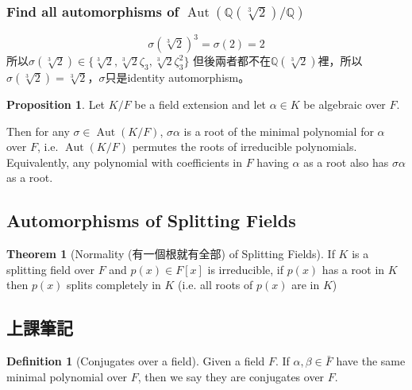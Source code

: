 \documentclass[12pt]{article}
\theoremstyle{definition}
\newtheorem{thm}{Theorem}
\newtheorem{dfn}{Definition}
\newtheorem{prop}{Proposition}
\newcommand{\QQ}{\mathbb Q}
\DeclareMathOperator{\Aut}{Aut}
\begin{document}
\subsubsection*{Find all automorphisms of $\Aut(\QQ(\sqrt[3]{2})/\QQ)$}
\[\sigma(\sqrt[3]{2})^3=\sigma(2)=2\]
所以$\sigma(\sqrt[3]{2})\in \{\sqrt[3]{2},\sqrt[3]{2}\zeta_3, \sqrt[3]{2}\zeta_3^2\}$
但後兩者都不在$\QQ(\sqrt[3]{2})$裡，所以$\sigma(\sqrt[3]{2})=\sqrt[3]{2}$，$\sigma$只是identity automorphism。

\begin{prop}
	Let $K/F$ be a field extension and let $\alpha\in K$ be algebraic over $F$.

	Then for any $\sigma\in\Aut(K/F)$, $\sigma\alpha$ is a root of the minimal polynomial for $\alpha$ over $F$,
	i.e. $\Aut(K/F)$ permutes the roots of irreducible polynomials. Equivalently, any polynomial with coefficients in $F$ having $\alpha$ as a root also has $\sigma\alpha$ as a root.
\end{prop}

\subsection{Automorphisms of Splitting Fields}

\begin{thm}[Normality (有一個根就有全部) of Splitting Fields]
	If $K$ is a splitting field over $F$ and $p(x)\in F[x]$ is irreducible,
	if $p(x)$ has a root in $K$ then $p(x)$ splits completely in $K$ (i.e. all roots of $p(x)$ are in $K$)
\end{thm}


























\subsection{上課筆記}

\begin{dfn}[Conjugates over a field]
	Given a field $F$.
	If $\alpha,\beta\in\bar{F}$
	have the same minimal polynomial over $F$, then
	we say they are conjugates over $F$.
\end{dfn}
\end{document}
